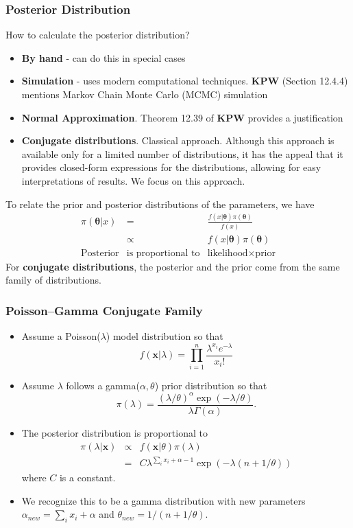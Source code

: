 \documentclass{beamer}
\begin{document}
\begin{frame}[shrink=2]
\frametitle{Posterior Distribution}
How to calculate the posterior distribution?

\begin{itemize}
\item \textbf{By hand} - can do this in special cases
\item \textbf{Simulation} - uses modern computational techniques. \textbf{KPW} (Section 12.4.4) mentions Markov Chain Monte Carlo (MCMC) simulation
\item \textbf{Normal Approximation}. Theorem 12.39 of \textbf{KPW} provides a justification
\item \textbf{Conjugate distributions}. Classical approach. Although this approach is available only for a limited number of distributions, it has the appeal that it provides closed-form expressions for the distributions, allowing for easy interpretations of results. We focus on this approach.
\end{itemize}
To relate the prior and posterior distributions of the parameters, we have
\begin{eqnarray*}
\pi(\boldsymbol \theta | x)&=&\frac{f(x|\boldsymbol \theta )\pi(\boldsymbol \theta)}{f(x)} \\
& \propto & f(x|\boldsymbol \theta ) \pi(\boldsymbol \theta) \\
\text{Posterior} &\text{is proportional to}&\text{likelihood} \times \text{prior}
\end{eqnarray*}
For \textbf{conjugate distributions}, the posterior and the prior come from the same family of distributions.
\end{frame}

\begin{frame}[shrink=2]
\frametitle{Poisson--Gamma Conjugate Family}
\begin{itemize}
\item Assume a Poisson($\lambda$) model distribution so that
$$f(\mathbf{x} | \lambda) = \prod_{i=1}^n \frac{\lambda^{x_i} e^{-\lambda}}{x_i!}$$
\item Assume $\lambda$ follows a gamma($\alpha, \theta$) prior distribution so that
$$\pi(\lambda) = \frac{\left(\lambda/\theta\right)^{\alpha} \exp(-\lambda/\theta)}{\lambda \Gamma(\alpha)}.$$
\item The posterior distribution is proportional to
\begin{eqnarray*}
\pi(\lambda | \mathbf{x}) & \propto & f(\mathbf{x}|\theta ) \pi(\lambda) \\
&=& C \lambda^{\sum_i x_i + \alpha -1} \exp(-\lambda (n+1/\theta))
\end{eqnarray*}
where $C$ is a constant.
\item We recognize this to be a gamma distribution with new parameters $\alpha_{new} = \sum_i x_i + \alpha$ and
$\theta_{new} = 1/(n + 1/\theta)$.
\end{itemize}
\end{frame}
\end{document}
